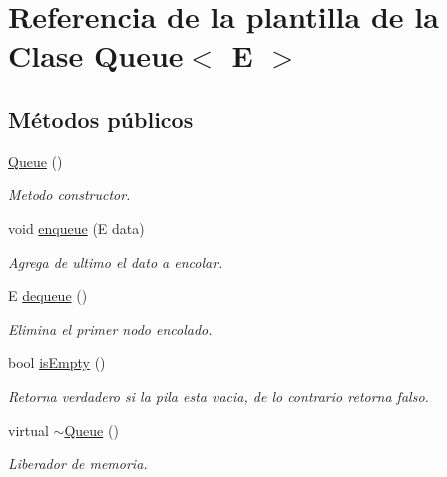 \hypertarget{classQueue}{\section{Referencia de la plantilla de la Clase Queue$<$ E $>$}
\label{classQueue}
}
\subsection*{Métodos públicos}
\begin{DoxyCompactItemize}
\item 
\hypertarget{classQueue_ab09891e54b51dc677ee6efb350687ae4}{\hyperlink{classQueue_ab09891e54b51dc677ee6efb350687ae4}{Queue} ()}\label{classQueue_ab09891e54b51dc677ee6efb350687ae4}

\begin{DoxyCompactList}\small\item\em Metodo constructor. \end{DoxyCompactList}\item 
void \hyperlink{classQueue_ad751a5ab9f313291a85455542b12a184}{enqueue} (E data)
\begin{DoxyCompactList}\small\item\em Agrega de ultimo el dato a encolar. \end{DoxyCompactList}\item 
E \hyperlink{classQueue_ac2b0f94e80e6df3002d284e38bdc117b}{dequeue} ()
\begin{DoxyCompactList}\small\item\em Elimina el primer nodo encolado. \end{DoxyCompactList}\item 
bool \hyperlink{classQueue_a4ea980b5773a6afbc3b2ed89bad8e7c9}{is\-Empty} ()
\begin{DoxyCompactList}\small\item\em Retorna verdadero si la pila esta vacia, de lo contrario retorna falso. \end{DoxyCompactList}\item 
\hypertarget{classQueue_a49fe82adb8dc2fb62ab53876a6933d0f}{virtual \hyperlink{classQueue_a49fe82adb8dc2fb62ab53876a6933d0f}{$\sim$\-Queue} ()}\label{classQueue_a49fe82adb8dc2fb62ab53876a6933d0f}

\begin{DoxyCompactList}\small\item\em Liberador de memoria. \end{DoxyCompactList}\end{DoxyCompactItemize}


